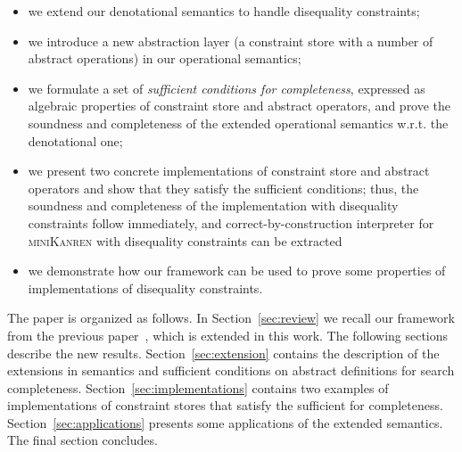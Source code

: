 \begin{itemize}
\item we extend our denotational semantics to handle disequality constraints;
\item we introduce a new abstraction layer (a constraint store with a number of abstract operations) in our operational semantics;
\item we formulate a set of \emph{sufficient conditions for completeness}, expressed as algebraic properties of constraint store and
  abstract operators, and prove the soundness and completeness of the extended operational semantics w.r.t. the denotational one;
\item we present two concrete implementations of constraint store and abstract operators and show that they satisfy the
  sufficient conditions; thus, the soundness and completeness of the implementation with disequality constraints follow
  immediately, and correct-by-construction interpreter for \textsc{miniKanren} with disequality constraints
  can be extracted
\item we demonstrate how our framework can be used to prove some properties of implementations of disequality constraints.
\end{itemize}

The paper is organized as follows. In Section~\ref{sec:review} we recall our framework from the previous paper~\cite{CertifiedSemantics}, which is extended in this work. The following sections describe the new results. Section~\ref{sec:extension} contains the description of the extensions in semantics and sufficient conditions on abstract definitions for search completeness. Section~\ref{sec:implementations} contains two examples of implementations of constraint stores that satisfy the sufficient for completeness. Section~\ref{sec:applications} presents some applications of the extended semantics. The final section concludes.